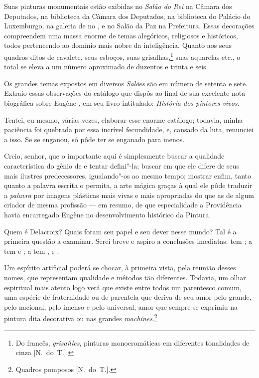 Suas pinturas monumentais estão exibidas no \textit{Salão do Rei} na
Câmara dos Deputados, na biblioteca da Câmara dos Deputados, na
biblioteca do Palácio do Luxemburgo, na galeria de  no , e	
no Salão da Paz na Prefeitura. Essas decorações compreendem uma massa
enorme de temas alegóricos, religiosos e históricos, todos pertencendo
ao domínio mais nobre da inteligência. Quanto aos seus quadros ditos de
cavalete, seus esboços, suas grisalhas,\footnote{ Do francês,
\textit{grisailles}, pinturas monocromáticas em diferentes tonalidades
de cinza [N.~do~T.].} suas aquarelas etc., o total se eleva a um
número aproximado de duzentos e trinta e seis.

Os grandes temas expostos em diversos \textit{Salões} são em número de
setenta e sete. Extraio essas observações do catálogo que  dispôs ao final de sua excelente nota biográfica sobre Eugène
, em seu livro intitulado: \textit{História dos pintores
vivos}.

Tentei, eu mesmo, várias vezes, elaborar esse enorme catálogo; todavia,
minha paciência foi quebrada por essa incrível fecundidade, e, cansado da
luta, renunciei a isso. Se  se enganou, só pôde ter
se enganado para menos.

Creio, senhor, que o importante aqui é simplesmente buscar a qualidade
característica do gênio de  e tentar defini"-la; buscar em que
ele difere de seus mais ilustres predecessores, igualando"-os ao mesmo
tempo; mostrar enfim, tanto quanto a palavra escrita o permita, a arte
mágica graças à qual ele pôde traduzir a \textit{palavra} por imagens
plásticas mais vivas e mais apropriadas do que as de algum criador de
mesma profissão --- em resumo, de que especialidade a Providência havia
encarregado Eugène  no desenvolvimento histórico da Pintura.

\setcounter{@sectionNumCenter}{0}

\sectionitem

Quem é Delacroix? Quais foram seu papel e seu dever nesse mundo? Tal é a
primeira questão a examinar. Serei breve e aspiro a conclusões
imediatas.  tem ; a  tem  e ; a
 tem ,  e .

Um espírito artificial poderá se chocar, à primeira vista, pela reunião
desses nomes, que representam qualidade e métodos tão diferentes.
Todavia, um olhar espiritual mais atento logo verá que existe entre
todos um parentesco comum, uma espécie de fraternidade ou de parentela
que deriva de seu amor pelo grande, pelo nacional, pelo imenso e pelo
universal, amor que sempre se exprimiu na pintura dita decorativa ou
nas grandes \textit{machines}.\footnote{ Quadros pomposos [N.~do~T.].}

